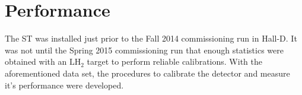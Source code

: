 \section{Performance} \label{sec:perform}

The ST was installed just prior to the Fall 2014 \gx{} commissioning run in Hall-D.  It was not until the Spring 2015 commissioning run that enough statistics were obtained with an $\mathrm{LH_{2}}$ target to perform reliable calibrations.  With the aforementioned data set, the procedures to calibrate the detector and measure it's performance were developed. 

